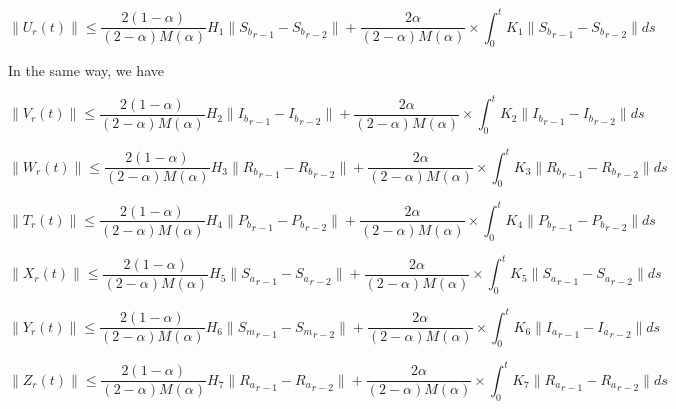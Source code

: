 \documentclass[10pt]{NSP1}
\begin{document}
\begin{equation}
\| U_{r}(t)\| \leq \frac{2(1 - \alpha)}{(2 - \alpha)M(\alpha)}H_{1}\|{S_{b}}_{r - 1} - {S_{b}}_{r - 2}\| + \frac{2\alpha}{(2 - \alpha)M(\alpha)} \times \int_{0}^{t}{}K_{1}\|{S_{b}}_{r - 1} - {S_{b}}_{r - 2}\| ds
\end{equation}

In the same way, we have

\begin{equation}
\| V_{r}(t)\| \leq \frac{2(1 - \alpha)}{(2 - \alpha)M(\alpha)}H_{2}\|{I_{b}}_{r - 1} - {I_{b}}_{r - 2}\| + \frac{2\alpha}{(2 - \alpha)M(\alpha)} \times \int_{0}^{t}{}K_{2}\|{I_{b}}_{r - 1} - {I_{b}}_{r - 2}\| ds
\end{equation}

\begin{equation}
\| W_{r}(t)\| \leq \frac{2(1 - \alpha)}{(2 - \alpha)M(\alpha)}H_{3}\|{R_{b}}_{r - 1} - {R_{b}}_{r - 2}\| + \frac{2\alpha}{(2 - \alpha)M(\alpha)} \times \int_{0}^{t}{}K_{3}\|{R_{b}}_{r - 1} - {R_{b}}_{r - 2}\| ds
\end{equation}

\begin{equation}
\| T_{r}(t)\| \leq \frac{2(1 - \alpha)}{(2 - \alpha)M(\alpha)}H_{4}\|{P_{b}}_{r - 1} - {P_{b}}_{r - 2}\| + \frac{2\alpha}{(2 - \alpha)M(\alpha)} \times \int_{0}^{t}{}K_{4}\|{P_{b}}_{r - 1} - {P_{b}}_{r - 2}\| ds
\end{equation}

\begin{equation}
\| X_{r}(t)\| \leq \frac{2(1 - \alpha)}{(2 - \alpha)M(\alpha)}H_{5}\|{S_{a}}_{r - 1} - {S_{a}}_{r - 2}\| + \frac{2\alpha}{(2 - \alpha)M(\alpha)} \times \int_{0}^{t}{}K_{5}\|{S_{a}}_{r - 1} - {S_{a}}_{r - 2}\| ds
\end{equation}

\begin{equation}
\| Y_{r}(t)\| \leq \frac{2(1 - \alpha)}{(2 - \alpha)M(\alpha)}H_{6}\|{S_{m}}_{r - 1} - {S_{m}}_{r - 2}\| + \frac{2\alpha}{(2 - \alpha)M(\alpha)} \times \int_{0}^{t}{}K_{6}\|{I_{a}}_{r - 1} - {I_{a}}_{r - 2}\| ds
\end{equation}

\begin{equation}
\| Z_{r}(t)\| \leq \frac{2(1 - \alpha)}{(2 - \alpha)M(\alpha)}H_{7}\|{R_{a}}_{r - 1} - {R_{a}}_{r - 2}\| + \frac{2\alpha}{(2 - \alpha)M(\alpha)} \times \int_{0}^{t}{}K_{7}\|{R_{a}}_{r - 1} - {R_{a}}_{r - 2}\| ds
\end{equation}
\end{document}
